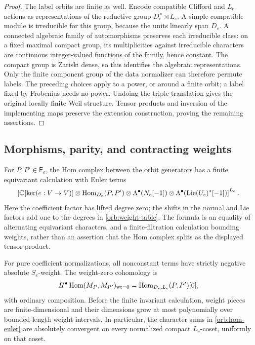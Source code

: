 \begin{proof}
The label orbits are finite as well.  Encode compatible Clifford and
$L_e$ actions as representations of the reductive group
$D_e^\times\rtimes L_e$.  A simple compatible module is irreducible
for this group, because the units linearly span $D_e$.  A connected
algebraic family of automorphisms preserves each irreducible class:
on a fixed maximal compact group, its multiplicities against
irreducible characters are continuous integer-valued functions of the
family, hence constant.  The compact group is Zariski dense, so this
identifies the algebraic representations.  Only the finite component
group of the data normalizer can therefore permute labels.  The
preceding choices apply to a power, or around a finite orbit; a label
fixed by Frobenius needs no power.  Undoing the triple translation
gives the original locally finite Weil structure.  Tensor products
and inversion of the implementing maps preserve the extension
construction, proving the remaining assertions.
\end{proof}

\subsection{Morphisms, parity, and contracting weights}

\begin{proposition}\label{orb:hom-calculation}
For $P,P'\in\mathsf E_e$, the Hom complex between the orbit generators
has a finite equivariant calculation with Euler terms
\begin{equation}\label{orb:hom-euler}
 \left[
 \mathbb C[\ker(e:V\to V)]\otimes
 \operatorname{Hom}_{D_e}(P,P')\otimes
 \Lambda^\bullet(N_e[-1])\otimes
 \Lambda^\bullet(\operatorname{Lie}(U_e)^*[-1])
 \right]^{L_e}.
\end{equation}
Here the coefficient factor has lifted degree zero; the shifts in the
normal and Lie factors add one to the degrees in
\eqref{orb:weight-table}.  The formula is an equality of alternating
equivariant characters, and a finite-filtration calculation bounding
weights, rather than an assertion that the Hom complex splits as the
displayed tensor product.

For pure coefficient normalizations, all nonconstant terms have
strictly negative absolute $S_e$-weight.  The weight-zero cohomology is
\begin{equation}\label{orb:weight-zero-hom}
 H^\bullet\operatorname{Hom}(M_P,M_{P'})_{\mathrm{wt}=0}
       =\operatorname{Hom}_{D_e,L_e}(P,P')[0],
\end{equation}
with ordinary composition.  Before the finite invariant calculation,
weight pieces are finite-dimensional and their dimensions grow at most
polynomially over bounded-length weight intervals.  In particular,
the character sums in \eqref{orb:hom-euler} are absolutely convergent
on every normalized compact $L_e$-coset, uniformly on that coset.
\end{proposition}

